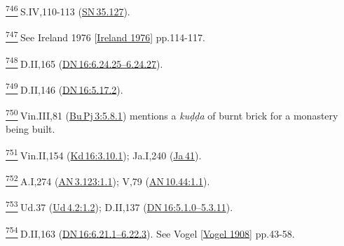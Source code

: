 \label{footprints_split_025.html_fn746}
\hyperref[footprints_split_019.htmlux5cux23fnref746]{\textsuperscript{746}} S.IV,110-113
(\href{https://suttacentral.net/sn35.127/en/sujato}{SN\,35.127}).

\label{footprints_split_025.html_fn747}
\hyperref[footprints_split_019.htmlux5cux23fnref747]{\textsuperscript{747}} See
{Ireland 1976
{{[}\hyperref[footprints_split_022.htmlux5cux23Irelandux5cux25201976]{Ireland
1976}{]}}} pp.114-117.

\label{footprints_split_025.html_fn748}
\hyperref[footprints_split_019.htmlux5cux23fnref748]{\textsuperscript{748}} D.II,165
(\href{https://suttacentral.net/dn16/en/sujato\#6.24.25}{DN\,16:6.24.25--6.24.27}).

\label{footprints_split_025.html_fn749}
\hyperref[footprints_split_019.htmlux5cux23fnref749]{\textsuperscript{749}} D.II,146
(\href{https://suttacentral.net/dn16/en/sujato\#5.17.2}{DN\,16:5.17.2}).

\label{footprints_split_025.html_fn750}
\hyperref[footprints_split_019.htmlux5cux23fnref750]{\textsuperscript{750}} Vin.III,81
(\href{https://suttacentral.net/pli-tv-bu-vb-pj3/en/brahmali\#5.8.1}{Bu\,Pj\,3:5.8.1})
mentions a \emph{kuḍḍa} of burnt brick for a monastery being built.

\label{footprints_split_025.html_fn751}
\hyperref[footprints_split_019.htmlux5cux23fnref751]{\textsuperscript{751}} Vin.II,154
(\href{https://suttacentral.net/pli-tv-kd16/en/brahmali\#3.10.1}{Kd\,16:3.10.1});
Ja.I,240 (\href{https://suttacentral.net/ja41}{Ja\,41}).

\label{footprints_split_025.html_fn752}
\hyperref[footprints_split_019.htmlux5cux23fnref752]{\textsuperscript{752}} A.I,274
(\href{https://suttacentral.net/an3.123/en/sujato\#1.1}{AN\,3.123:1.1});
V,79
(\href{https://suttacentral.net/an10.44/en/sujato\#1.1}{AN\,10.44:1.1}).

\label{footprints_split_025.html_fn753}
\hyperref[footprints_split_019.htmlux5cux23fnref753]{\textsuperscript{753}} Ud.37
(\href{https://suttacentral.net/ud4.2/en/sujato\#1.2}{Ud\,4.2:1.2});
D.II,137
(\href{https://suttacentral.net/dn16/en/sujato\#5.1.0}{DN\,16:5.1.0--5.3.11}).

\label{footprints_split_025.html_fn754}
\hyperref[footprints_split_019.htmlux5cux23fnref754]{\textsuperscript{754}} D.II,163
(\href{https://suttacentral.net/dn16/en/sujato\#6.21.1}{DN\,16:6.21.1--6.22.3}).
See {Vogel
{{[}\hyperref[footprints_split_022.htmlux5cux23Vogelux5cux25201908]{Vogel
1908}{]}}} pp.43-58.

